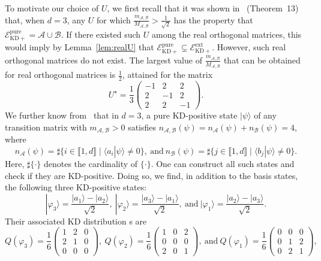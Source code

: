 \documentclass[a4paper, notitlepage, 11pt]{article}
\numberwithin{equation}{section}
\newcommand{\blue}[1]{{\color{blue} #1}}
\newcommand{\cket}[1]{|#1\rangle}
\newcommand{\Acal}{{\mathcal A}}
\newcommand{\Bcal}{{\mathcal B}}
\newcommand{\EcalKDCpu}{{\mathcal E}_{\mathrm{KD+}}^{\mathrm{pure}}}
\newcommand{\EcalKDCext}{{\mathcal E}_{\mathrm{KD+}}^{\mathrm{ext}}}
\newcommand{\nab}{n_{\Acal,\Bcal}}
\newcommand{\na}{n_{\Acal}}
\newcommand{\nb}{n_{\Bcal}}
\newcommand{\mab}{m_{\Acal,\Bcal}}
\newcommand{\Mab}{M_{\Acal, \Bcal}}
\begin{document}
To motivate our choice of $U$, we first recall that it was shown in~\cite{debievre2023a} (Theorem~13) that, when $d=3$, any $U$ for which $\frac{\mab}{\Mab}>\frac{1}{\sqrt{2}}$ has the property that $\EcalKDCpu=\Acal\cup\Bcal$. If there existed such $U$ among the real orthogonal matrices, this would imply by Lemma~\ref{lem:realU} that $\EcalKDCpu\subsetneq \EcalKDCext$. However, such real orthogonal matrices do not exist. The largest value of $\frac{\mab}{\Mab}$ that can be obtained for real orthogonal matrices is $\frac{1}{2}$, attained for the matrix
\begin{equation}\label{eq:specialU}
U^\star=\frac13
\begin{pmatrix} 
-1&2&2\\
2&-1&2\\
2&2&-1
\end{pmatrix}.
\end{equation}
 We further know from~\cite{debievre2021} that in $d=3$, a pure KD-positive  state $\cket{\psi}$ of any transition matrix with $\mab>0$ satisfies $\nab(\psi) = n_{\mathcal{A}}(\psi) + n_{\mathcal{B}}(\psi) =4$, where 
\begin{equation}\label{eq:nab}
\na(\psi)=\sharp\{i\in\llbracket 1,d\rrbracket \mid \langle a_i|\psi\rangle\not=0\}, \ \mathrm{ and } \ \nb(\psi)=\sharp\{j\in\llbracket 1,d\rrbracket \mid \langle b_j|\psi\rangle\not=0\}.
\end{equation}
Here, $\sharp \{ \cdot \}$ denotes the cardinality of $ \{ \cdot \}$.
One can  construct all such states and check if they are KD-positive. Doing so, we find, in addition to the basis states, the following three KD-positive  states:
\[
\cket{\varphi_3} = \frac{\cket{a_1}-\cket{a_2}}{\sqrt{2}},\
\cket{\varphi_2} = \frac{\cket{a_3}-\cket{a_1}}{\sqrt{2}}, \ \mathrm{ and } \
\cket{\varphi_1} = \frac{\cket{a_2}-\cket{a_3}}{\sqrt{2}}.
\]
Their associated KD distribution\blue{s} are
\[
Q(\varphi_3) = \frac{1}{6}\begin{pmatrix} 1 & 2 & 0 \\ 2 & 1 & 0 \\ 0 & 0 & 0 \end{pmatrix}, \ Q(\varphi_2) = \frac{1}{6}\begin{pmatrix} 1 & 0 & 2 \\ 0 & 0 & 0 \\ 2 & 0 & 1 \end{pmatrix}, \ \mathrm{ and } \ Q(\varphi_1) = \frac{1}{6}\begin{pmatrix} 0 & 0 & 0 \\ 0 & 1 & 2 \\ 0 & 2 & 1 \end{pmatrix} ,
\]
\end{document}
